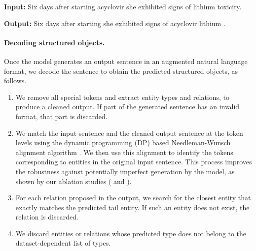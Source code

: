 \begin{footnotesize}
\begin{customquote}
\quotespacestart
    \textbf{Input:}
    Six days after starting acyclovir she exhibited signs of lithium toxicity.
    
    \textbf{Output:}
    Six days after starting \entitybegin {} \separator {} \entityend she exhibited signs of \entitybegin \entitybegin {} \separator {} \entityend {} \separator {} \separator {} \equals acyclovir \separator {} \equals lithium \entityend .
\quotespaceend
\end{customquote}
\end{footnotesize}

\paragraph{Decoding structured objects.}
Once the model generates an output sentence in an augmented natural language format, we decode the sentence to obtain the predicted structured objects, as follows. 
\begin{enumerate}[leftmargin=*]
\vspace{-.05cm}
    \itemsep0em
    \item We remove all special tokens and extract entity types and relations, to produce a cleaned output.
    If part of the generated sentence has an invalid format, that part is discarded.
    \item %
    We match the input sentence and the cleaned output sentence at the token levels using the dynamic programming (DP) based Needleman-Wunsch alignment algorithm \citep{needleman1970general}. 
    We then use this alignment to identify the tokens corresponding to entities in the original input sentence.
    This process improves the robustness against potentially imperfect generation by the model, as shown by our ablation studies ( and ).
    \item
    For each relation proposed in the output, we search for the closest entity that exactly matches the predicted tail entity.
    If such an entity does not exist, the relation is discarded.
    \item We discard entities or relations whose predicted type does not belong to the dataset-dependent list of types.
\vspace{-.05cm}
\end{enumerate}

